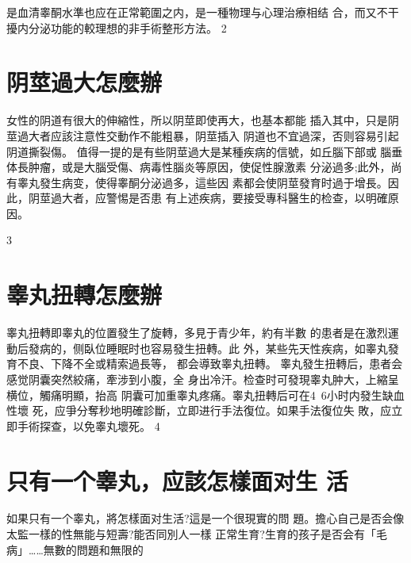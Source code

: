\documentclass[12pt,UTF8]{ctexbook}
\begin{document}
是血清睾酮水準也应在正常範圍之内，是一種物理与心理治療相结
合，而又不干擾内分泌功能的較理想的非手術整形方法。
2
\section{阴莖過大怎麼辦}
女性的阴道有很大的伸縮性，所以阴莖即使再大，也基本都能
插入其中，只是阴莖過大者应該注意性交動作不能粗暴，阴莖插入
阴道也不宜過深，否则容易引起阴道撕裂傷。
值得一提的是有些阴莖過大是某種疾病的信號，如丘腦下部或
腦垂体長肿瘤，或是大腦受傷、病毒性腦炎等原因，使促性腺激素
分泌過多;此外，尚有睾丸發生病变，使得睾酮分泌過多，這些因
素都会使阴莖發育时過于增長。因此，阴莖過大者，应警惕是否患
有上述疾病，要接受專科醫生的检查，以明確原因。

3
\section{睾丸扭轉怎麼辦}
睾丸扭轉即睾丸的位置發生了旋轉，多見于青少年，約有半數
的患者是在激烈運動后發病的，侧臥位睡眠时也容易發生扭轉。此
外，某些先天性疾病，如睾丸發育不良、下降不全或精索過長等，
都会導致睾丸扭轉。
睾丸發生扭轉后，患者会感觉阴囊突然絞痛，牽涉到小腹，全
身出冷汗。检查时可發現睾丸肿大，上縮呈横位，觸痛明顯，抬高
阴囊可加重睾丸疼痛。睾丸扭轉后可在4~6小时内發生缺血性壞
死，应爭分奪秒地明確診斷，立即进行手法復位。如果手法復位失
敗，应立即手術探查，以免睾丸壞死。
4
\section{只有一个睾丸，应該怎樣面对生
活}
如果只有一个睾丸，將怎樣面对生活?這是一个很現實的問
題。擔心自己是否会像太監一樣的性無能与短壽?能否同別人一樣
正常生育?生育的孩子是否会有「毛病」……無數的問題和無限的
\end{document}
